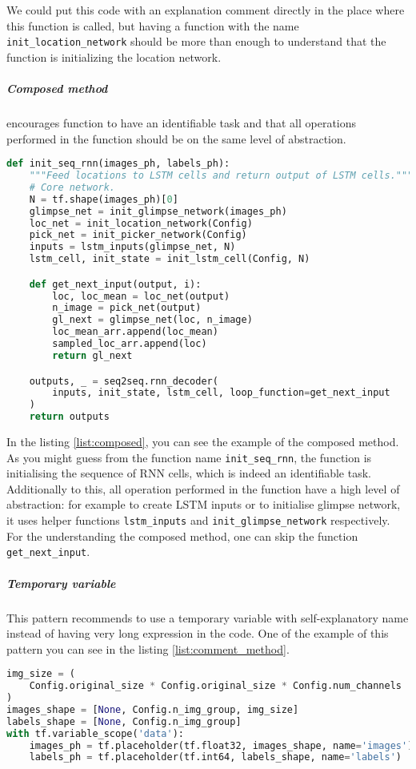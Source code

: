 We could put this code  with an explanation
comment directly in the place where this function is called, but having
a function with the name \lstinline{init_location_network} should be more than enough
to understand that the function is initializing the location network.

\subparagraph{Composed method} encourages function to have an identifiable
task and that all operations performed in the function should be on the same
level of abstraction.

\begin{lstlisting}[language=Python, caption={Method comment example},label={list:composed}]
def init_seq_rnn(images_ph, labels_ph):
    """Feed locations to LSTM cells and return output of LSTM cells."""
    # Core network.
    N = tf.shape(images_ph)[0]
    glimpse_net = init_glimpse_network(images_ph)
    loc_net = init_location_network(Config)
    pick_net = init_picker_network(Config)
    inputs = lstm_inputs(glimpse_net, N)
    lstm_cell, init_state = init_lstm_cell(Config, N)

    def get_next_input(output, i):
        loc, loc_mean = loc_net(output)
        n_image = pick_net(output)
        gl_next = glimpse_net(loc, n_image)
        loc_mean_arr.append(loc_mean)
        sampled_loc_arr.append(loc)
        return gl_next

    outputs, _ = seq2seq.rnn_decoder(
        inputs, init_state, lstm_cell, loop_function=get_next_input
    )
    return outputs
\end{lstlisting}

In the listing \ref{list:composed}, you can see the example of the composed method.
As you might guess from the function name \lstinline{init_seq_rnn}, the
function
is initialising the sequence of RNN cells, which is indeed an identifiable task.
Additionally to this, all operation performed in the function
have a high level of abstraction: for example to
create LSTM inputs or to initialise glimpse network, it uses helper functions
\lstinline{lstm_inputs} and \lstinline{init_glimpse_network} respectively.
For the understanding the composed method, one can skip the function \lstinline{get_next_input}.

\subparagraph{Temporary variable} This pattern recommends to use a temporary
variable with self-explanatory name instead of having very long expression
in the code. One of the example of this pattern you can see
in the listing \ref{list:comment_method}.

\begin{lstlisting}[language=Python, caption={Method comment example},label={list:comment_method}]
img_size = (
	Config.original_size * Config.original_size * Config.num_channels
)
images_shape = [None, Config.n_img_group, img_size]
labels_shape = [None, Config.n_img_group]
with tf.variable_scope('data'):
	images_ph = tf.placeholder(tf.float32, images_shape, name='images')
	labels_ph = tf.placeholder(tf.int64, labels_shape, name='labels')
\end{lstlisting}


